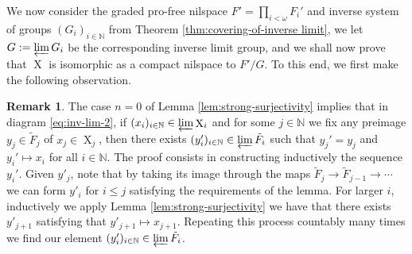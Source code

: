 \documentclass[a4paper,12pt,reqno]{amsart}
\theoremstyle{definition}
\newtheorem{remark}[theorem]{Remark}
\def\to{\rightarrow}
\newcommand{\mb}{\mathbb}
\DeclareMathOperator{\ns}{X}
\begin{document}
\noindent We now consider the graded pro-free nilspace $F'=\prod_{i<\omega}F_i'$ and inverse system of groups $(G_i)_{i\in \mb{N}}$ from Theorem \ref{thm:covering-of-inverse limit}, we let $G:=\varprojlim G_i$ be the corresponding inverse limit group, and we shall now prove that $\ns$ is isomorphic as a compact nilspace to $F'/G$. To this end, we first make the following observation.

\begin{remark}\label{rem:lift-throu-inv-lim} The case $n=0$ of Lemma \ref{lem:strong-surjectivity} implies that in diagram \eqref{eq:inv-lim-2}, if $(x_i)_{i\in \mb{N}}\in \varprojlim \ns_i$ and for some $j\in \mb{N}$ we fix any preimage $y_j\in \tilde F_j$ of $x_j\in \ns_j$, then there exists  $(y_i')_{i\in \mb{N}}\in \varprojlim \tilde F_i$ such that $y_j'=y_j$ and $y_i'\mapsto x_i$ for all $i\in \mb{N}$. The proof consists in constructing inductively the sequence $y_i'$. Given $y'_j$, note that by taking its image through the maps $\tilde{F}_j\to \tilde{F}_{j-1}\to \cdots$ we can form $y'_i$ for $i\le j$ satisfying the requirements of the lemma. For larger $i$, inductively we apply Lemma \ref{lem:strong-surjectivity} we have that there exists $y'_{j+1}$ satisfying that $y'_{j+1}\mapsto x_{j+1}$. Repeating this process countably many times we find our element $(y_i')_{i\in \mb{N}}\in \varprojlim \tilde{F}_i$.
\end{remark}
\end{document}
